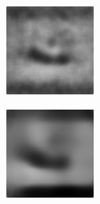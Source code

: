 \begin{figure}[H]
\begin{subfigure}[t]{0.15\textwidth}
  \end{subfigure}
  \begin{subfigure}[t]{0.15\textwidth}
    \includegraphics[width=\linewidth]{img/one-trial/prediction_3_cnnv3.png}
  \end{subfigure}
  \begin{subfigure}[t]{0.15\textwidth}
    \includegraphics[width=\linewidth]{img/one-trial/prediction_3_cnnv4.png}
  \end{subfigure}
  \\
    \vspace{0.1cm}
  

\end{figure}
